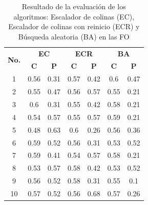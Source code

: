 \begin{table}[H]
	\centering
	\caption{Resultado de la evaluación de los algoritmos: Escalador de colinas (EC), Escalador de colinas con reinicio (ECR) y Búsqueda aleatoria (BA) en las FO} \label{table:resultados-beisbol}
	\begin{tabular}{| c | c | c| c | c | c | c |}
		\toprule
		\multirow{2}{1cm}{\textbf{No.}} & \multicolumn{2}{c|}{\textbf{EC}} &         \multicolumn{2}{c|}{\textbf{ECR}}         & \multicolumn{2}{c|}{\textbf{BA}} \\ \cmidrule{2-7} 
		& \textbf{C} & \textbf{P} & \textbf{C} & \textbf{P} & \textbf{C} & \textbf{P} \\ \midrule
		1                               & 0.56 & 0.31                      & 0.57                    & 0.42                    & 0.6  & 0.47         \\ \hline
		2                               & 0.55 & 0.47                      & 0.56                    & 0.57                    & 0.55 & 0.21         \\ \hline
		3                               & 0.6  & 0.31                      & 0.55                    & 0.42                    & 0.58 & 0.21         \\ \hline
		4                               & 0.54 & 0.57                      & 0.55                    & 0.57                    & 0.59 & 0.21         \\ \hline
		5                               & 0.48 & 0.63                      & 0.6                     & 0.26                    & 0.56 & 0.36         \\ \hline
		6                               & 0.59 & 0.52                      & 0.56                    & 0.31                    & 0.53 & 0.52         \\ \hline
		7                               & 0.59 & 0.41                      & 0.54                    & 0.57                    & 0.58 & 0.21         \\ \hline
		8                               & 0.53 & 0.57                      & 0.58                    & 0.42                    & 0.53 & 0.52         \\ \hline
		9                               & 0.56 & 0.52                      & 0.58                    & 0.31                    & 0.55 & 0.1          \\ \hline
		10                              & 0.57 & 0.52                      & \cellcolor{gray!30} 0.56 & \cellcolor{gray!30}0.68 & 0.57 & 0.26         \\ \bottomrule
	\end{tabular}
\end{table}


